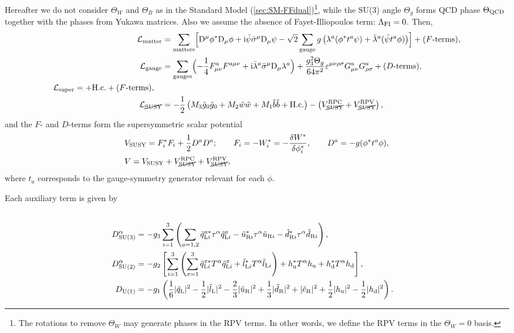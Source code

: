 \documentclass[CheatSheet]{subfiles}
\begin{document}
Hereafter we do not consider $\Theta_W$ and $\Theta_B$ as in the Standard Model (\cref{sec:SM-FFdual})\footnote{The rotations to remove $\Theta_W$ may generate phases in the RPV terms. In other words, we define the RPV terms in the $\Theta_W=0$ basis.}, while the SU(3) angle $\Theta_g$ forms QCD phase $\Theta\w{QCD}$ together with the phases from Yukawa matrices.
Also we assume the absence of Fayet-Illiopoulos term: $\Lambda\w{FI}=0$.
Then,
\begin{align}
 \mathcal L\w{matter} &= \sum\w{matters}\Bigl[\DD^\mu\phi^*\DD_\mu\phi+\ii\bpsi\bsigma^\mu\DD_\mu\psi
- \sqrt2\sum\w{gauge} g\left(\lambda^a(\phi^*t^a\psi)+\blambda^a(\bpsi t^a\phi)\right)
\Bigr] + \text{($F$-terms)},\\
 \mathcal L\w{gauge} &= \sum\w{gauges}\Bigl(-\frac14F^a_{\mu\nu}F^{a\mu\nu}+\ii\blambda^a\bsigma^\mu\DD_\mu\lambda^a\Bigr) + \frac{g_3^2\Theta_g}{64\pi^2}\vep^{\mu\nu\rho\sigma}G^a_{\mu\nu}G^a_{\rho\sigma}+ \text{($D$-terms)},
\\
\begin{split}
  \mathcal L\w{super} &=
   
+ \text{H.c.} +\text{($F$-terms)},
\end{split}\\
\mathcal L_{\text{\cancel{SUSY}}}
&=
- \frac12\left(M_3\tig_0\tig_0+M_2\tiw\tiw+M_1\tib\tib+\text{H.c.}\right)
-
\left(
V^{\mathrm{RPC}}_{\text{\cancel{SUSY}}}
+V^{\mathrm{RPV}}_{\text{\cancel{SUSY}}}\right),
\end{align}
and the $F$- and $D$-terms form the supersymmetric scalar potential
\begin{align}
& V\w{SUSY} = F^{*}_i F_i+\frac12 D^aD^a;
\qquad
 F_i = -W_i^* = -\frac{\delta W^*}{\delta \phi_i^*},
\qquad
 D^a = -g(\phi^* t^a \phi),
\\
&V=V\w{SUSY} +
V^{\mathrm{RPC}}_{\text{\cancel{SUSY}}}
+V^{\mathrm{RPV}}_{\text{\cancel{SUSY}}},
\end{align}
where $t_a$ corresponds to the gauge-symmetry generator relevant for each $\phi$.

Each auxiliary term is given by
\begin{align}

\\
D\w{SU(3)}^\alpha &= -g_3\sum_{i=1}^3\left(
 \sum_{a=1,2}
  \tqL[i]^{a*} \tau^\alpha \tqL[i]^{a}
- \tuR[i]^{*} \tau^\alpha \tuR[i]
- \tdR[i]^{*} \tau^\alpha \tdR[i]
\right),\\
%
D\w{SU(2)}^\alpha &= -g_2\left[
   \sum_{i=1}^3\left(
  \sum_{x=1}^3 \tqL[i]^{x*}T^\alpha\tqL[i]^{x}
+              \tlL[i]^{*}T^\alpha \tlL[i]
  \right)
+ \hu^*T^\alpha\hu
+ \hd^*T^\alpha\hd
\right],\\
%
 D\w{U(1)} &= -g_1\left(
  \frac16|\tqL|^2
- \frac12|\tlL|^2
- \frac23|\tuR|^2
+ \frac13|\tdR|^2
+        |\teR|^2
+ \frac12|\hu|^2
- \frac12|\hd|^2
\right).
\end{align}
\end{document}
